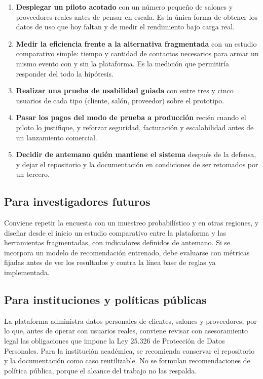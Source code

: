 \begin{enumerate}
    \item \textbf{Desplegar un piloto acotado} con un número pequeño de
          salones y proveedores reales antes de pensar en escala. Es la
          única forma de obtener los datos de uso que hoy faltan y de
          medir el rendimiento bajo carga real.
    \item \textbf{Medir la eficiencia frente a la alternativa fragmentada}
          con un estudio comparativo simple: tiempo y cantidad de
          contactos necesarios para armar un mismo evento con y sin la
          plataforma. Es la medición que permitiría responder del todo la
          hipótesis.
    \item \textbf{Realizar una prueba de usabilidad guiada} con entre tres
          y cinco usuarios de cada tipo (cliente, salón, proveedor) sobre
          el prototipo.
    \item \textbf{Pasar los pagos del modo de prueba a producción}
          recién cuando el piloto lo justifique, y reforzar seguridad,
          facturación y escalabilidad antes de un lanzamiento comercial.
    \item \textbf{Decidir de antemano quién mantiene el sistema} después
          de la defensa, y dejar el repositorio y la documentación en
          condiciones de ser retomados por un tercero.
\end{enumerate}

\subsection{Para investigadores futuros}

Conviene repetir la encuesta con un muestreo probabilístico y en otras
regiones, y diseñar desde el inicio un estudio comparativo entre la
plataforma y las herramientas fragmentadas, con indicadores definidos de
antemano. Si se incorpora un modelo de recomendación entrenado, debe
evaluarse con métricas fijadas antes de ver los resultados y contra la
línea base de reglas ya implementada.

\subsection{Para instituciones y políticas públicas}

La plataforma administra datos personales de clientes, salones y
proveedores, por lo que, antes de operar con usuarios reales, conviene
revisar con asesoramiento legal las obligaciones que impone la Ley 25.326
de Protección de Datos Personales. Para la institución académica, se
recomienda conservar el repositorio y la documentación como caso
reutilizable. No se formulan recomendaciones de política pública, porque
el alcance del trabajo no las respalda.

